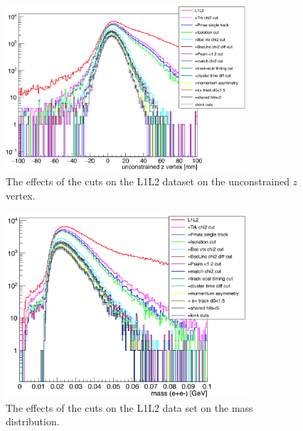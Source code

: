 \begin{figure}[H]
  \centering
      \includegraphics[width=0.8\textwidth]{pics/appendix/zvtxCuts_L1L2.png}
  \caption{The effects of the cuts on the L1L2 dataset on the unconstrained $z$ vertex.}
  \label{fig:zvtxCuts_l1l2}
\end{figure} 
\begin{figure}[H]
  \centering
      \includegraphics[width=0.8\textwidth]{pics/appendix/massCuts_L1L2.png}
  \caption{The effects of the cuts on the L1L2 data set on the mass distribution.}
  \label{fig:massCuts_l1l2}
\end{figure} 
